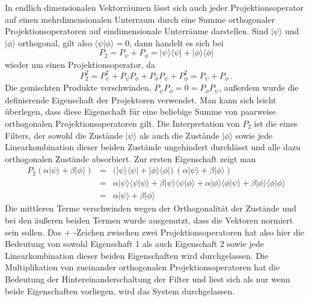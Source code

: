 In endlich dimensionalen
Vektorr\"aumen l\"asst sich auch jeder Projektionsoperator auf einen mehrdimensionalen Unterraum
durch eine Summe orthogonaler Projektionsoperatoren auf eindimensionale Unterr\"aume darstellen. 
Sind $|\psi\rangle$ und $|\phi\rangle$ orthogonal, gilt also $\langle \psi|\phi \rangle=0$, dann handelt
es sich bei
\begin{equation}
                  P_2 = P_\psi + P_\phi =  |\psi \rangle \langle \psi | + |\phi \rangle \langle \phi |
\end{equation}
wieder um einen Projektionsoperator, da
\begin{equation}
                  P_2^2 = P_\psi^2 +  P_\psi P_\phi + P_\phi P_\psi + P_\phi^2 
                  =  P_\psi + P_\phi \, .
\end{equation}
Die gemischten Produkte verschwinden, $P_\psi P_\phi=0=P_\phi P_\psi$, au\ss erdem 
wurde die definierende Eigenschaft der Projektoren verwendet. Man kann sich leicht \"uberlegen,
dass diese Eigenschaft f\"ur eine beliebige Summe von paarweise orthogonalen Projektionsoperatoren
gilt. Die Interpretation von $P_2$ ist die eines Filters, der sowohl die Zust\"ande $|\psi\rangle$ als
auch die Zust\"ande $|\phi \rangle$ sowie jede Linearkombination dieser beiden Zust\"ande
ungehindert durchl\"asst und alle dazu orthogonalen Zust\"ande absorbiert. Zur ersten Eigenschaft
zeigt man
\begin{eqnarray}
                  P_2 (\alpha |\psi\rangle + \beta |\phi \rangle ) &=& 
               \big( |\psi \rangle \langle \psi | + |\phi \rangle \langle \phi | \big)~ (\alpha |\psi\rangle + \beta |\phi \rangle )  \\
               &=& 
               \alpha |\psi \rangle \langle \psi |\psi\rangle + 
               \beta |\psi \rangle \langle \psi |\phi\rangle + 
              \alpha |\phi \rangle \langle \phi | \psi\rangle + \beta |\phi \rangle \langle \phi |\phi \rangle   \\
              &=&  \alpha |\psi\rangle + \beta |\phi \rangle 
\end{eqnarray}
Die mittleren Terme verschwinden wegen der Orthogonalit\"at der Zust\"ande und bei den \"au\ss eren
beiden Termen wurde ausgenutzt, dass die Vektoren normiert sein sollen. Das \glqq + \grqq-Zeichen zwischen
zwei Projektionsoperatoren hat
also hier die Bedeutung von \glqq sowohl Eigenschaft 1 als auch Eigenschaft 2 sowie jede
Linearkombination dieser beiden Eigenschaften wird durchgelassen\grqq. 
Die Multiplikation von zueinander orthogonalen Projektionsoperatoren
hat die Bedeutung der Hintereinanderschaltung der Filter und liest sich 
als \glqq nur wenn beide Eigenschaften vorliegen, wird das System durchgelassen\grqq. 

